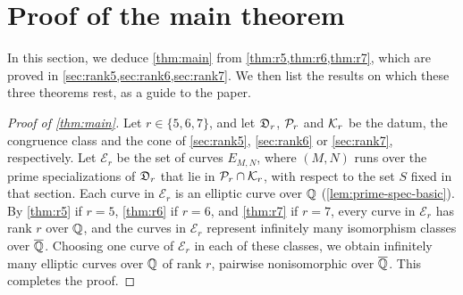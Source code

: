 \chapter{Proof of the main theorem}\label{sec:proof}

In this section, we deduce \cref{thm:main} from \cref{thm:r5,thm:r6,thm:r7}, which are proved in \cref{sec:rank5,sec:rank6,sec:rank7}. We then list the results on which these three theorems rest, as a guide to the paper.

\begin{proof}[Proof of \cref{thm:main}]
Let $r\in\{5,6,7\}$, and let $\mathfrak D_r$, $\mathcal P_r$ and $\mathcal K_r$ be the datum, the congruence class and the cone of \cref{sec:rank5}, \cref{sec:rank6} or \cref{sec:rank7}, respectively. Let $\mathcal E_r$ be the set of curves $E_{M,N}$, where $(M,N)$ runs over the prime specializations of $\mathfrak D_r$ that lie in $\mathcal P_r\cap\mathcal K_r$, with respect to the set $S$ fixed in that section. Each curve in $\mathcal E_r$ is an elliptic curve over $\mathbb Q$ (\cref{lem:prime-spec-basic}). By \cref{thm:r5} if $r=5$, \cref{thm:r6} if $r=6$, and \cref{thm:r7} if $r=7$, every curve in $\mathcal E_r$ has rank $r$ over $\mathbb Q$, and the curves in $\mathcal E_r$ represent infinitely many isomorphism classes over $\overline{\mathbb Q}$. Choosing one curve of $\mathcal E_r$ in each of these classes, we obtain infinitely many elliptic curves over $\mathbb Q$ of rank $r$, pairwise nonisomorphic over $\overline{\mathbb Q}$. This completes the proof.
\end{proof}

